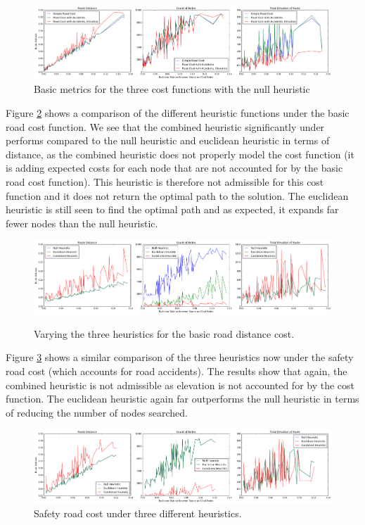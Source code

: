 \documentclass[11pt]{article}
\begin{document}
\begin{figure}[H]
\includegraphics[width=1\textwidth]{../images/cost}
\caption{Basic metrics for the three cost functions with the null heuristic}
\label{cost_comparison}
\end{figure}

Figure \ref{simple_distance_cost} shows a comparison of the different heuristic functions under the basic road cost function. We see that the combined heuristic significantly under performs compared to the null heuristic and euclidean heuristic in terms of distance, as the combined heuristic does not properly model the cost function (it is adding expected costs for each node that are not accounted for by the basic road cost function). This heuristic is therefore not admissible for this cost function and it does not return the optimal path to the solution. The euclidean heuristic is still seen to find the optimal path and as expected, it expands far fewer nodes than the null heuristic.

\begin{figure}[H]
\caption{Varying the three heuristics for the basic road distance cost.}
\includegraphics[width=1\textwidth]{../images/simple_distance_cost}
\label{simple_distance_cost}
\end{figure}

Figure \ref{simple_distance_and_safety} shows a similar comparison of the three heuristics now under the safety road cost (which accounts for road accidents). The results show that again, the combined heuristic is not admissible as elevation is not accounted for by the cost function. The euclidean heuristic again far outperforms the null heuristic in terms of reducing the number of nodes searched.

\begin{figure}[H]
\includegraphics[width=1\textwidth]{../images/simple_distance_and_elevation}
\caption{Safety road cost under three different heuristics.}
\label{simple_distance_and_safety}
\end{figure}
\end{document}
